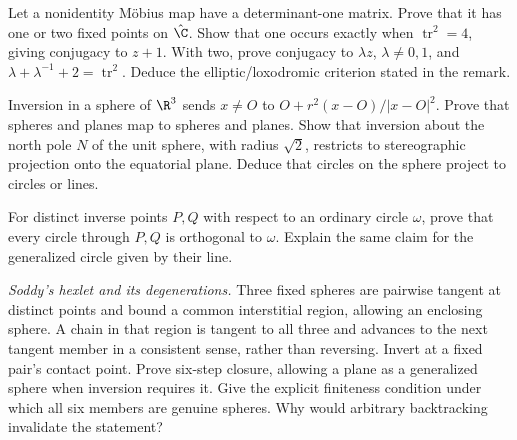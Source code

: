\begin{exercise}[$\star\star$]\label{geometry:ex:trace}
Let a nonidentity M\"obius map have a determinant-one matrix. Prove that it has one or two fixed points on $\hat{\C}$. Show that one occurs exactly when $\operatorname{tr}^2=4$, giving conjugacy to $z+1$. With two, prove conjugacy to $\lambda z$, $\lambda\ne0,1$, and
$\lambda+\lambda^{-1}+2=\operatorname{tr}^2$. Deduce the elliptic/loxodromic criterion stated in the remark.
\end{exercise}
\begin{exercise}[$\star\star$]\label{geometry:ex:stereo}
Inversion in a sphere of $\R^3$ sends $x\ne O$ to $O+r^2(x-O)/|x-O|^2$. Prove that spheres and planes map to spheres and planes. Show that inversion about the north pole $N$ of the unit sphere, with radius $\sqrt2$, restricts to stereographic projection onto the equatorial plane. Deduce that circles on the sphere project to circles or lines.
\end{exercise}
\begin{exercise}[$\star$]\label{geometry:ex:orthcircles}
For distinct inverse points $P,Q$ with respect to an ordinary circle $\omega$, prove that every circle through $P,Q$ is orthogonal to $\omega$. Explain the same claim for the generalized circle given by their line.
\end{exercise}
\begin{exercise}[$\star\star\star$]\label{geometry:ex:hexlet}
\emph{Soddy's hexlet and its degenerations.} Three fixed spheres are pairwise tangent at distinct points and bound a common interstitial region, allowing an enclosing sphere. A chain in that region is tangent to all three and advances to the next tangent member in a consistent sense, rather than reversing. Invert at a fixed pair's contact point. Prove six-step closure, allowing a plane as a generalized sphere when inversion requires it. Give the explicit finiteness condition under which all six members are genuine spheres. Why would arbitrary backtracking invalidate the statement?
\end{exercise}

